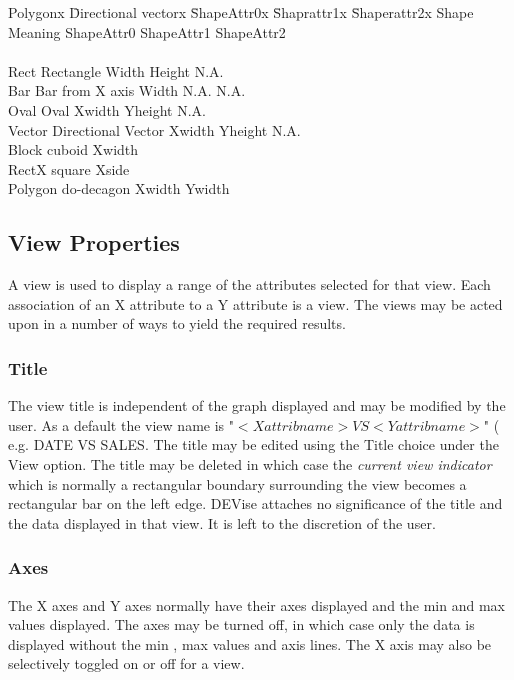 \begin {tabbing}
Polygonx \= Directional vectorx \= ShapeAttr0x \= Shaprattr1x \= Shaperattr2x \kill
Shape \> Meaning \> ShapeAttr0 \> ShapeAttr1 \> ShapeAttr2 \\ \\
Rect  \> Rectangle \>  Width \> Height \> N.A.  \\
Bar   \> Bar from X axis\> Width \> N.A. \> N.A. \\
Oval  \> Oval \> Xwidth \> Yheight \> N.A.\\
Vector \> Directional Vector \> Xwidth \> Yheight \> N.A. \\
Block \> cuboid \> Xwidth \>\\
RectX \> square \> Xside\\
Polygon \> do-decagon \> Xwidth \> Ywidth\\  

\end{tabbing}

\subsection{View Properties}

A view is used to display a range of the attributes selected for that view. Each association of an X attribute to a Y attribute is a view. The views may be acted upon in a number of ways to yield the required results.


\subsubsection{Title}

The view title is independent of the graph displayed and may be modified by the user. As a default the view name is  "$<X attrib name > VS <Y attrib name >$" ( e.g. DATE VS SALES. The title may be edited using the Title choice under the View option.  The title may be deleted in which case the {\em current view indicator} which is normally a rectangular boundary surrounding the view becomes a rectangular bar on the left edge. DEVise attaches no significance of the title and the data displayed in that view. It is left to the discretion of the user.

\subsubsection{Axes}

The X axes and Y axes normally have their axes displayed and the min and max values displayed. The axes may be turned off, in which case only the data is displayed without the min , max values and axis lines. The X axis may also be selectively toggled on or off for a view.

